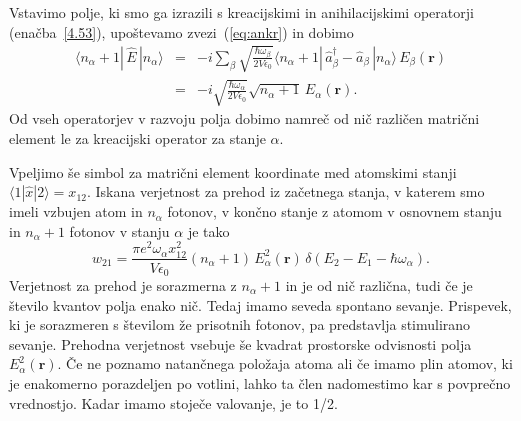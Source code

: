 Vstavimo polje, ki smo ga izrazili s kreacijskimi in anihilacijskimi operatorji (enačba~\ref{4.53}),
upoštevamo zvezi~(\ref{eq:ankr}) in dobimo
\begin{eqnarray}
\langle n_{\alpha}+1|\, \hat{E}\,|n_{\alpha}\rangle & = 
& -i\sum_{\beta}\sqrt{\frac{\hbar\omega_{\beta}}{2V\epsilon_{0}}}
\langle n_{\alpha}+1|\,\hat{a}_{\beta}^{\dagger}-\hat{a}_{\beta}\,|n_{\alpha}\rangle\, 
E_{\beta}(\mathbf{r})\nonumber \\
 & = & -i\sqrt{\frac{\hbar\omega_{\alpha}}{2V\epsilon_{0}}}
 \sqrt{n_{\alpha}+1}\, E_{\alpha}(\mathbf{r}).
\end{eqnarray}
Od vseh operatorjev v razvoju polja dobimo namreč od nič različen matrični
element le za kreacijski operator za stanje $\alpha$.

Vpeljimo še simbol za matrični element koordinate med 
atomskimi stanji $\langle1|\hat{x}|2\rangle=x_{12}$. Iskana verjetnost za prehod iz 
začetnega stanja, v katerem smo imeli vzbujen atom in $n_{\alpha}$ fotonov, v končno
stanje z atomom v osnovnem stanju in $n_{\alpha}+1$ fotonov v stanju $\alpha$ je tako
\begin{equation}
w_{21}=\frac{\pi e^{2}\omega_{\alpha}x_{12}^{2}}{V\epsilon_{0}}
(n_{\alpha}+1)\,E_{\alpha}^{2}(\mathbf{r})\,\delta(E_{2}-E_{1}-\hbar\omega_{\alpha}).
\label{4.56}
\end{equation}
Verjetnost za prehod je sorazmerna z $n_{\alpha}+1$ in je od nič
različna, tudi če je število kvantov polja enako nič. Tedaj imamo seveda
spontano sevanje. Prispevek, ki je 
sorazmeren s številom že prisotnih fotonov, pa predstavlja stimulirano 
sevanje. Prehodna verjetnost vsebuje
še kvadrat prostorske odvisnosti polja $E_{\alpha}^{2}(\mathbf{r})$.
Če ne poznamo natančnega položaja atoma ali če imamo plin atomov, ki je enakomerno
porazdeljen po votlini, lahko ta člen nadomestimo kar s povprečno vrednostjo.
Kadar imamo stoječe valovanje, je to 1/2.

